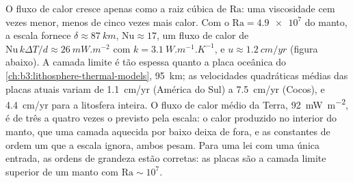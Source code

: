 O fluxo de calor cresce apenas como a raiz cúbica de $\mathrm{Ra}$: uma viscosidade cem vezes
menor, menos de cinco vezes mais calor. Com o
$\mathrm{Ra} = \num{4.9e7}$ do manto, a escala fornece $\delta \approx \qty{87}{km}$,
$\mathrm{Nu} \approx 17$, um fluxo de calor de $\mathrm{Nu}\,k\Delta T/d \approx
\qty{26}{mW.m^{-2}}$ com $k = \qty{3.1}{W.m^{-1}.K^{-1}}$, e $u \approx
\qty{1.2}{cm/yr}$ (figura abaixo). A camada limite é tão espessa quanto a
placa oceânica do \cref{ch:b3:lithosphere-thermal-models}, \qty{95}{km}; as
velocidades quadráticas médias das placas atuais variam de \qty{1.1}{cm/yr} (América
do Sul) a \qty{7.5}{cm/yr} (Cocos), e \qty{4.4}{cm/yr} para a litosfera inteira. O
fluxo de calor médio da Terra, \qty{92}{mW.m^{-2}}, é de três a quatro
vezes o previsto pela escala: o calor produzido no interior do manto, que uma camada
aquecida por baixo deixa de fora, e as constantes de ordem um que a escala
ignora, ambos pesam. Para uma lei com uma única entrada, as ordens de grandeza
estão corretas: as placas são a camada limite superior de um manto com $\mathrm{Ra}
\sim 10^7$.


